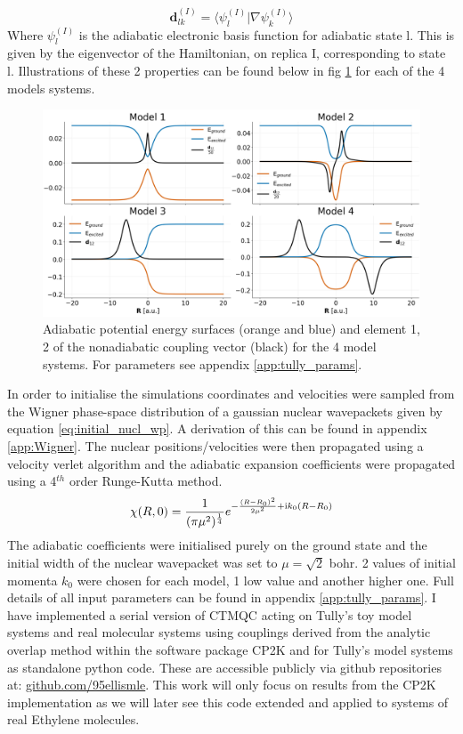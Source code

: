 \begin{equation}
  \mathbf{d}_{lk}^{(I)} = \langle \psi_{l}^{(I)} | \nabla \psi_k^{(I)} \rangle
  \label{eq:NACV_def}
\end{equation}
Where $\psi_{l}^{(I)}$ is the adiabatic electronic basis function for adiabatic state l. This is given by the eigenvector of the Hamiltonian, on replica I, corresponding to state l. Illustrations of these 2 properties can be found below in fig \ref{fig:tully_schematics} for each of the 4 models systems.
\begin{figure}[H]
  \includegraphics[width=\textwidth]{Chapter_tullyModels/model_schematics.png}
  \caption{\label{fig:tully_schematics}Adiabatic potential energy surfaces (orange and blue) and element 1, 2 of the nonadiabatic coupling vector (black) for the 4 model systems. For parameters see appendix \ref{app:tully_params}.}
\end{figure}
\newpage
\noindent In order to initialise the simulations coordinates and velocities were sampled from the Wigner phase-space distribution of a gaussian nuclear wavepackets given by equation \eqref{eq:initial_nucl_wp}. A derivation of this can be found in appendix \ref{app:Wigner}. The nuclear positions/velocities were then propagated using a velocity verlet algorithm and the adiabatic expansion coefficients were propagated using a 4$^{th}$ order Runge-Kutta method.
\begin{equation}
  \chi(R, 0) = \frac{1}{(\pi \mu^2)^{\frac{1}{4}}} e^{-\frac{(R - R_0)^2}{2 \mu^2} + \mathrm{i} k_0 (R - R_0) }
  \label{eq:initial_nucl_wp}
\end{equation}
The adiabatic coefficients were initialised purely on the ground state and the initial width of the nuclear wavepacket was set to $\mu = \sqrt{2}$ bohr. 2 values of initial momenta $k_0$ were chosen for each model, 1 low value and another higher one. Full details of all input parameters can be found in appendix \ref{app:tully_params}. I have implemented a serial version of CTMQC acting on Tully's toy model systems and real molecular systems using couplings derived from the analytic overlap method \cite{gajdos_ultrafast_2014} within the software package CP2K \cite{cp2k} and for Tully's model systems as standalone python code. These are accessible publicly via github repositories at: \href{https://github.com/95ellismle}{github.com/95ellismle}. This work will only focus on results from the CP2K implementation as we will later see this code extended and applied to systems of real Ethylene molecules.

